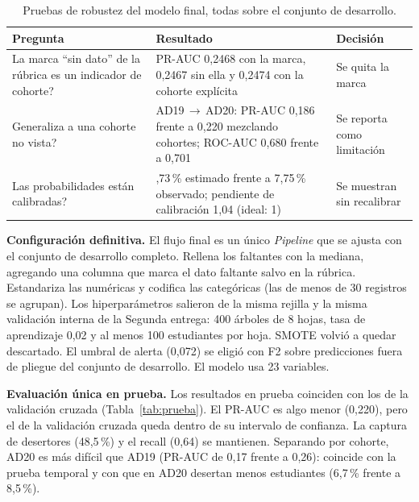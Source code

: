 \documentclass[11pt,a4paper]{article}
\begin{document}
\begin{table}[H]
\centering
\small
\caption{Pruebas de robustez del modelo final, todas sobre el conjunto de desarrollo.}
\label{tab:sensibilidad}
\begin{tabular}{>{\raggedright\arraybackslash}p{4.3cm}>{\raggedright\arraybackslash}p{6.1cm}>{\raggedright\arraybackslash}p{4.1cm}}
\toprule
Pregunta & Resultado & Decisión \\
\midrule
\textquestiondown{}La marca ``sin dato'' de la rúbrica es un indicador de cohorte? & PR-AUC 0,2468 con la marca, 0,2467 sin ella y 0,2474 con la cohorte explícita & Se quita la marca \\
\textquestiondown{}Generaliza a una cohorte no vista? & AD19\,$\rightarrow$\,AD20: PR-AUC 0,186 frente a 0,220 mezclando cohortes; ROC-AUC 0,680 frente a 0,701 & Se reporta como limitación \\
\textquestiondown{}Las probabilidades están calibradas? & 7,73\,\% estimado frente a 7,75\,\% observado; pendiente de calibración 1,04 (ideal: 1) & Se muestran sin recalibrar \\
\bottomrule
\end{tabular}
\end{table}

\textbf{Configuración definitiva.} El flujo final es un único \textit{Pipeline} que se ajusta con el conjunto de desarrollo completo. Rellena los faltantes con la mediana, agregando una columna que marca el dato faltante salvo en la rúbrica. Estandariza las numéricas y codifica las categóricas (las de menos de 30 registros se agrupan). Los hiperparámetros salieron de la misma rejilla y la misma validación interna de la Segunda entrega: 400 árboles de 8 hojas, tasa de aprendizaje 0,02 y al menos 100 estudiantes por hoja. SMOTE volvió a quedar descartado. El umbral de alerta (0,072) se eligió con F2 sobre predicciones fuera de pliegue del conjunto de desarrollo. El modelo usa 23 variables.

\textbf{Evaluación única en prueba.} Los resultados en prueba coinciden con los de la validación cruzada (Tabla~\ref{tab:prueba}). El PR-AUC es algo menor (0,220), pero el de la validación cruzada queda dentro de su intervalo de confianza. La captura de desertores (48,5\,\%) y el recall (0,64) se mantienen. Separando por cohorte, AD20 es más difícil que AD19 (PR-AUC de 0,17 frente a 0,26): coincide con la prueba temporal y con que en AD20 desertan menos estudiantes (6,7\,\% frente a 8,5\,\%).
\end{document}
